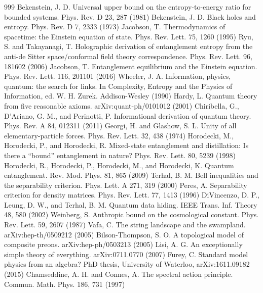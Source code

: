 \begin{thebibliography}{999}
 Bekenstein, J. D. Universal upper bound on the entropy-to-energy ratio for bounded systems. Phys. Rev. D 23, 287 (1981)
 Bekenstein, J. D. Black holes and entropy. Phys. Rev. D 7, 2333 (1973)
 Jacobson, T. Thermodynamics of spacetime: the Einstein equation of state. Phys. Rev. Lett. 75, 1260 (1995)
 Ryu, S. and Takayanagi, T. Holographic derivation of entanglement entropy from the anti-de Sitter space/conformal field theory correspondence. Phys. Rev. Lett. 96, 181602 (2006)
 Jacobson, T. Entanglement equilibrium and the Einstein equation. Phys. Rev. Lett. 116, 201101 (2016)
 Wheeler, J. A. Information, physics, quantum: the search for links. In Complexity, Entropy and the Physics of Information, ed. W. H. Zurek. Addison-Wesley (1990)
 Hardy, L. Quantum theory from five reasonable axioms. arXiv:quant-ph/0101012 (2001)
 Chiribella, G., D'Ariano, G. M., and Perinotti, P. Informational derivation of quantum theory. Phys. Rev. A 84, 012311 (2011)
 Georgi, H. and Glashow, S. L. Unity of all elementary-particle forces. Phys. Rev. Lett. 32, 438 (1974)
 Horodecki, M., Horodecki, P., and Horodecki, R. Mixed-state entanglement and distillation: Is there a ``bound'' entanglement in nature? Phys. Rev. Lett. 80, 5239 (1998)
 Horodecki, R., Horodecki, P., Horodecki, M., and Horodecki, K. Quantum entanglement. Rev. Mod. Phys. 81, 865 (2009)
 Terhal, B. M. Bell inequalities and the separability criterion. Phys. Lett. A 271, 319 (2000)
 Peres, A. Separability criterion for density matrices. Phys. Rev. Lett. 77, 1413 (1996)
 DiVincenzo, D. P., Leung, D. W., and Terhal, B. M. Quantum data hiding. IEEE Trans. Inf. Theory 48, 580 (2002)
 Weinberg, S. Anthropic bound on the cosmological constant. Phys. Rev. Lett. 59, 2607 (1987)
 Vafa, C. The string landscape and the swampland. arXiv:hep-th/0509212 (2005)
 Bilson-Thompson, S. O. A topological model of composite preons. arXiv:hep-ph/0503213 (2005)
 Lisi, A. G. An exceptionally simple theory of everything. arXiv:0711.0770 (2007)
 Furey, C. Standard model physics from an algebra? PhD thesis, University of Waterloo, arXiv:1611.09182 (2015)
 Chamseddine, A. H. and Connes, A. The spectral action principle. Commun. Math. Phys. 186, 731 (1997)

\end{thebibliography}
